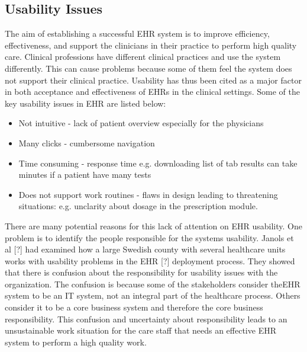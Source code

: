 \documentclass[14pt]{article}
\begin{document}
\subsection{Usability Issues}
The aim of establishing a successful \gls{EHR} system is to improve efficiency, effectiveness, and support the clinicians in their practice to perform high quality care. Clinical professions have different clinical practices and use the system differently. This can cause problems because some of them feel the system does not support their clinical practice. Usability has thus been cited as a major factor in both acceptance and effectiveness of \gls{EHR}s in the clinical settings. Some of the key usability issues in EHR are listed below:
\begin{itemize}
\item Not intuitive - lack of patient overview especially for the physicians
\item Many clicks - cumbersome navigation
\item Time consuming - response time e.g. downloading list of tab results can take minutes if a patient have many tests
\item Does not support work routines - flaws in design leading to threatening situations:  e.g. unclarity about dosage in the  prescription module.
\end{itemize}

There are many potential reasons for this lack of attention on \gls{EHR} usability. One problem is to identify the people responsible for the systems usability. Janols et al [?] had examined how a large Swedish county with several healthcare units works with usability problems in the \gls{EHR} [?] deployment process. They showed that there is confusion about the responsibility for usability issues with the organization. The confusion is because some of the stakeholders consider the\gls{EHR} system to be an IT system, not an integral part of the healthcare process. Others consider it to be a core business system and therefore the core business responsibility. This confusion and uncertainty about responsibility leads to an unsustainable work situation for the care staff that needs an effective \gls{EHR} system to perform a high quality work.
\end{document}
